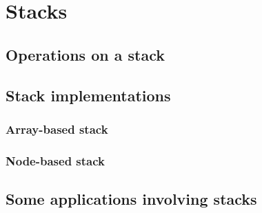 \chapter{Stacks}
\label{chap:stacks}

\section{Operations on a stack}

\section{Stack implementations}
\subsection{Array-based stack}
\subsection{Node-based stack}

\section{Some applications involving stacks}
